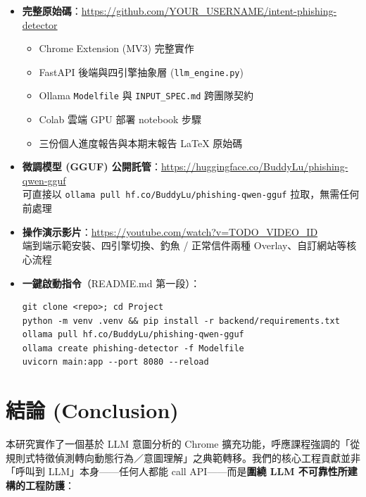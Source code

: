 \documentclass[11pt, a4paper]{article}
\begin{document}
\begin{itemize}[leftmargin=2em]
  \item \textbf{完整原始碼}：\url{https://github.com/YOUR_USERNAME/intent-phishing-detector}
  \begin{itemize}
    \item Chrome Extension (MV3) 完整實作
    \item FastAPI 後端與四引擎抽象層 (\texttt{llm\_engine.py})
    \item Ollama \texttt{Modelfile} 與 \texttt{INPUT\_SPEC.md} 跨團隊契約
    \item Colab 雲端 GPU 部署 notebook 步驟
    \item 三份個人進度報告與本期末報告 LaTeX 原始碼
  \end{itemize}
  \item \textbf{微調模型 (GGUF) 公開託管}：\url{https://huggingface.co/BuddyLu/phishing-qwen-gguf} \\
        可直接以 \texttt{ollama pull hf.co/BuddyLu/phishing-qwen-gguf} 拉取，無需任何前處理
  \item \textbf{操作演示影片}：\url{https://youtube.com/watch?v=TODO_VIDEO_ID} \\
        端到端示範安裝、四引擎切換、釣魚 / 正常信件兩種 Overlay、自訂網站等核心流程
  \item \textbf{一鍵啟動指令}（README.md 第一段）：
\begin{verbatim}
git clone <repo>; cd Project
python -m venv .venv && pip install -r backend/requirements.txt
ollama pull hf.co/BuddyLu/phishing-qwen-gguf
ollama create phishing-detector -f Modelfile
uvicorn main:app --port 8080 --reload
\end{verbatim}
\end{itemize}

\section{結論 (Conclusion)}\label{sec:conclusion}

本研究實作了一個基於 LLM 意圖分析的 Chrome 擴充功能，呼應課程強調的「從規則式特徵偵測轉向動態行為／意圖理解」之典範轉移。我們的核心工程貢獻並非「呼叫到 LLM」本身——任何人都能 call API——而是\textbf{圍繞 LLM 不可靠性所建構的工程防護}：
\end{document}
